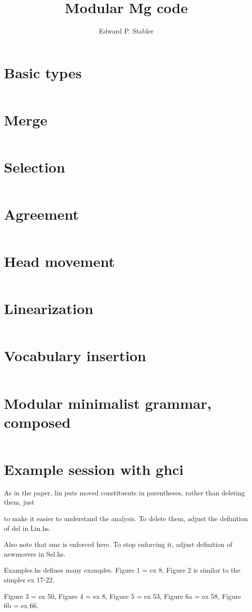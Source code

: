 \documentclass{article}
\title{Modular Mg code}
\author{Edward P. Stabler}
\begin{document}
\thispagestyle{empty}

\setcounter{section}{-1}

\eject
\section{Basic types}
\inputminted[fontsize=\footnotesize]{haskell}{MgTypes.hs}

\section{Merge}
\inputminted[fontsize=\footnotesize]{haskell}{Mrg.hs}

\section{Selection}
\inputminted[fontsize=\footnotesize]{haskell}{Sel.hs}

\eject
\section{Agreement}
\inputminted[fontsize=\footnotesize]{haskell}{Agr.hs}

\vfill\eject
\section{Head movement}
\inputminted[fontsize=\footnotesize]{haskell}{Hm.hs}

\section{Linearization}
\inputminted[fontsize=\footnotesize]{haskell}{Lin.hs}

\eject
\section{Vocabulary insertion}
\inputminted[fontsize=\footnotesize]{haskell}{Vi.hs}

\section{Modular minimalist grammar, composed}
\inputminted[fontsize=\footnotesize]{haskell}{Mg.hs}

\eject
\section*{Example session with ghci}
As in the paper, lin puts moved constituents in parentheses, rather
than deleting them, just

to make it easier to understand the analysis. To delete them, adjust
the definition of del in Lin.hs.

\noindent
Also note that smc is enforced here. To stop enforcing it, adjust
definition of newmovers in Sel.hs.

\noindent
Examples.hs defines many examples.
Figure 1 = ex 8,
Figure 2 is similar to the simpler ex 17-22,

Figure 3 = ex 50,
Figure 4 = ex 8,
Figure 5 = ex 53,
Figure 6a = ex 58,
Figure 6b = ex 66.

\inputminted[fontsize=\footnotesize]{haskell}{Examples-session.txt}
\end{document}
